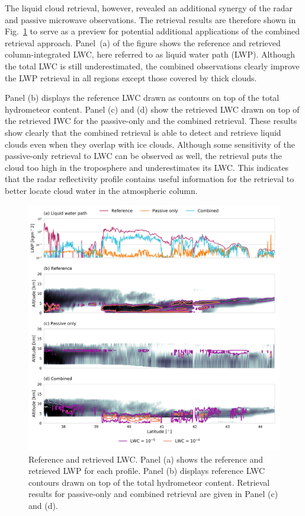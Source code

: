 \documentclass[journal abbreviation, manuscript]{copernicus}
\begin{document}
The liquid cloud retrieval, however, revealed an additional synergy of the radar
and passive microwave observations. The retrieval results are therefore shown in
Fig.~\ref{fig:results_cw_b} to serve as a preview for potential additional
applications of the combined retrieval approach. Panel~(a) of the figure shows
the reference and retrieved column-integrated LWC, here referred to as liquid
water path (LWP). Although the total LWC is still underestimated, the combined
observations clearly improve the LWP retrieval in all regions except those covered
by thick clouds.

Panel (b) displays the reference LWC drawn as contours on top of the total
hydrometeor content. Panel (c) and (d) show the retrieved LWC drawn on top of
the retrieved IWC for the passive-only and the combined retrieval. These results
show clearly that the combined retrieval is able to detect and retrieve liquid
clouds even when they overlap with ice clouds. Although some sensitivity of the
passive-only retrieval to LWC can be observed as well, the retrieval puts the
cloud too high in the troposphere and underestimates its LWC. This indicates
that the radar reflectivity profile contains useful information for the
retrieval to better locate cloud water in the atmospheric column.

\begin{figure}
\centering
\includegraphics[width = \textwidth]{../plots/results_cw_b_LargePlateAggregate}
\caption{Reference and retrieved LWC. Panel (a) shows the reference and retrieved
  LWP for each profile. Panel (b) displays reference LWC contours drawn on top
  of the total hydrometeor content. Retrieval results for passive-only and combined
  retrieval are given in Panel (c) and (d).}
\label{fig:results_cw_b}
\end{figure}
\end{document}
